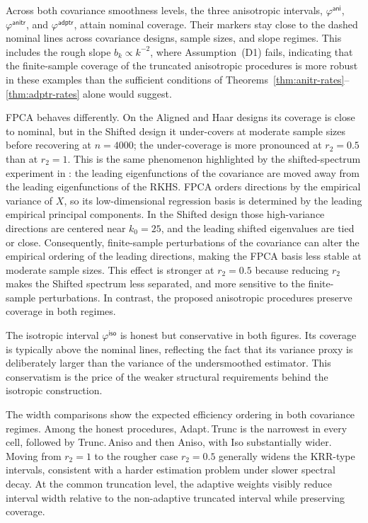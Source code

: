 \documentclass[aos]{imsart}
\newcommand{\iso}{\mathsf{iso}}
\newcommand{\ani}{\mathsf{ani}}
\newcommand{\anitr}{\mathsf{anitr}}
\newcommand{\adptr}{\mathsf{adptr}}
\theoremstyle{plain}
\theoremstyle{definition}
\theoremstyle{definition}
\begin{document}
Across both covariance smoothness levels, the three anisotropic intervals, $\varphi^{\ani}$, $\varphi^{\anitr}$, and $\varphi^{\adptr}$, attain nominal coverage. Their markers stay close to the dashed nominal lines across covariance designs, sample sizes, and slope regimes. This includes the rough slope $b_k\propto k^{-2}$, where Assumption~(D1) fails, indicating that the finite-sample coverage of the truncated anisotropic procedures is more robust in these examples than the sufficient conditions of Theorems~\ref{thm:anitr-rates}--\ref{thm:adptr-rates} alone would suggest.

FPCA behaves differently. On the Aligned and Haar designs its coverage is close to nominal, but in the Shifted design it under-covers at moderate sample sizes before recovering at $n=4000$; the under-coverage is more pronounced at $r_2=0.5$ than at $r_2=1$. This is the same phenomenon highlighted by the shifted-spectrum experiment in \cite{cai2012minimax}: the leading eigenfunctions of the covariance are moved away from the leading eigenfunctions of the RKHS. FPCA orders directions by the empirical variance of $X$, so its low-dimensional regression basis is determined by the leading empirical principal components. In the Shifted design those high-variance directions are centered near $k_0=25$, and the leading shifted eigenvalues are tied or close. Consequently, finite-sample perturbations of the covariance can alter the empirical ordering of the leading directions, making the FPCA basis less stable at moderate sample sizes. This effect is stronger at $r_2=0.5$ because reducing $r_2$ makes the Shifted spectrum less separated, and more sensitive to the finite-sample perturbations. In contrast, the proposed anisotropic procedures preserve coverage in both regimes.

The isotropic interval $\varphi^{\iso}$ is honest but conservative in both figures. Its coverage is typically above the nominal lines, reflecting the fact that its variance proxy is deliberately larger than the variance of the undersmoothed estimator. This conservatism is the price of the weaker structural requirements behind the isotropic construction.

The width comparisons show the expected efficiency ordering in both covariance regimes. Among the honest procedures, Adapt.\,Trunc is the narrowest in every cell, followed by Trunc.\,Aniso and then Aniso, with Iso substantially wider. Moving from $r_2=1$ to the rougher case $r_2=0.5$ generally widens the KRR-type intervals, consistent with a harder estimation problem under slower spectral decay. At the common truncation level, the adaptive weights visibly reduce interval width relative to the non-adaptive truncated interval while preserving coverage.
\end{document}
